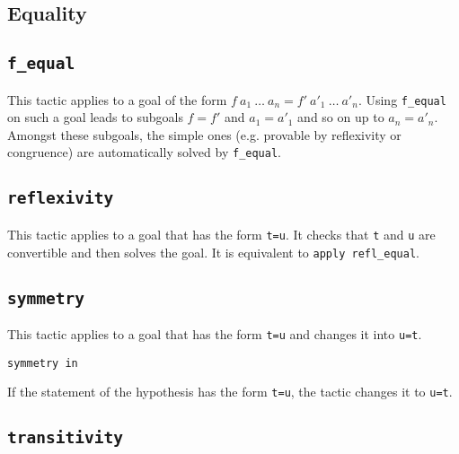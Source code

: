 \begin{coq_example*}
\ErrMsg {}

\section{Equality}

\subsection{\tt f\_equal}
\label{f-equal}

This tactic applies to a goal of the form $f\ a_1\ \ldots\ a_n = f'\
a'_1\ \ldots\ a'_n$. Using {\tt f\_equal} on such a goal leads to
subgoals $f=f'$ and $a_1=a'_1$ and so on up to $a_n=a'_n$. Amongst
these subgoals, the simple ones (e.g. provable by
reflexivity or congruence) are automatically solved by {\tt f\_equal}.

\subsection{\tt reflexivity}
\label{reflexivity}

This tactic applies to a goal that has the form {\tt t=u}. It checks
that {\tt t} and {\tt u} are convertible and then solves the goal.
It is equivalent to {\tt apply refl\_equal}.

\begin{ErrMsgs}
\item {}
\item {}
\end{ErrMsgs}

\subsection{\tt symmetry}

This tactic applies to a goal that has the form {\tt t=u} and changes it
into {\tt u=t}.

\begin{Variants}
\item {\tt symmetry in \ident} 

If the statement of the hypothesis {\ident} has the form {\tt t=u},
the tactic changes it to {\tt u=t}.
\end{Variants}

\subsection{\tt transitivity \term}


\end{coq_example*}
